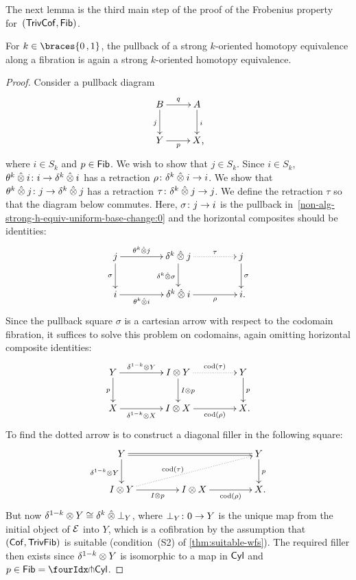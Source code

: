 \documentclass[reqno,10pt,a4paper,oneside,draft]{amsart}
\begin{document}
{{The next lemma is the third main step of the proof of the Frobenius property for~$(\mathsf{TrivCof}, \mathsf{Fib})$.

\begin{lemma} \label{thm:non-alg-frobenius-she}
For $k \in \braces{0\,, 1}$, the pullback of a strong $k$-oriented homotopy equivalence along a fibration is again a strong $k$-oriented homotopy equivalence.
\end{lemma}

\begin{proof}
Consider a pullback diagram
\begin{equation} \label{non-alg-strong-h-equiv-uniform-base-change:0}
\begin{gathered}
\xymatrix{
 B \ar[d]_j \ar[r]^q & A \ar[d]^i \\
Y \ar[r]_p & X \rlap{,}}
\end{gathered}
\end{equation}
where $i  \in S_k$ and $p \in \mathsf{Fib}$.
We wish to show that $j \in  S_k$.
Since $i \in S_k$, $\theta^k \mathbin{\hat{\otimes}} i \colon i \to \delta^k \mathbin{\hat{\otimes}} i$ has a retraction $\rho \colon \delta^k \mathbin{\hat{\otimes}} i \to i$.
We show that $\theta^k \mathbin{\hat{\otimes}} j \colon j \to \delta^k \mathbin{\hat{\otimes}} j$ has a retraction $\tau \colon  \delta^k \mathbin{\hat{\otimes}} j \to j$.
We define the retraction $\tau$ so that the diagram below commutes.
Here, $\sigma \colon j \to i$ is the pullback in~\eqref{non-alg-strong-h-equiv-uniform-base-change:0} and the horizontal composites should be identities:
\[
\xymatrix@C+2em{
j
  \ar[r]^-{\thetak \hatotimes j}
  \ar[d]_{\sigma}
&
  \kcyl \hatotimes j
  \ar@{.>}[r]^-{\tau}
  \ar[d]_{\kcyl \hatotimes \sigma}
&
 j
  \ar[d]^{\sigma}
\\
  i
  \ar[r]_-{\thetak \hatotimes i}
&
  \kcyl \hatotimes i
  \ar[r]_-{\rho}
&
  i
\rlap{.}}
\]
Since the pullback square $\sigma$ is a cartesian arrow with respect to the codomain fibration, it suffices to solve this problem on codomains, again omitting horizontal composite identities:
\[
\xymatrix@C+2em{
  Y
  \ar[r]^-{\kcylinv \otimes Y}
  \ar[d]_{p}
&
  \interval \otimes Y
  \ar@{.>}[r]^-{\cod(\tau)}
  \ar[d]^{\interval \otimes p}
&
  Y
  \ar[d]^{p}
\\
  X
  \ar[r]_-{\kcylinv \otimes X}
&
  \interval \otimes X
  \ar[r]_-{\cod(\rho)}
&
  X
\rlap{.}}
\]
To find the dotted arrow is to construct a diagonal filler in the following square:
\[
\xymatrix@C+2em{
  Y
  \ar@{=}[rr]
  \ar[d]_{\kcylinv \otimes Y}
&&
  Y
  \ar[d]^{p}
\\
  \interval \otimes Y
  \ar[r]_-{I \otimes p}
  \ar@{.>}[urr]^(0.4){\cod(\tau)}
&
  \interval \otimes X
  \ar[r]_-{\cod(\rho)}
&
  X
\rlap{.}}
\]
But now $\delta^{1-k} \otimes Y \cong \delta^k \mathbin{\hat{\otimes}} \bot_Y$, where $\bot_Y \colon 0 \to Y$ is the unique map from the initial object of $\mathcal{E}$ into $Y$, which is a cofibration by the assumption that $(\mathsf{Cof}, \mathsf{TrivFib})$ is suitable (condition~(S2) of \cref{thm:suitable-wfs}).
The required filler then exists since $\delta^{1-k} \otimes Y$ is isomorphic to a map in $\mathsf{Cyl}$ and~$p \in \Fib = \liftr{\Cyl}$.
\end{proof}

}}
\end{document}
